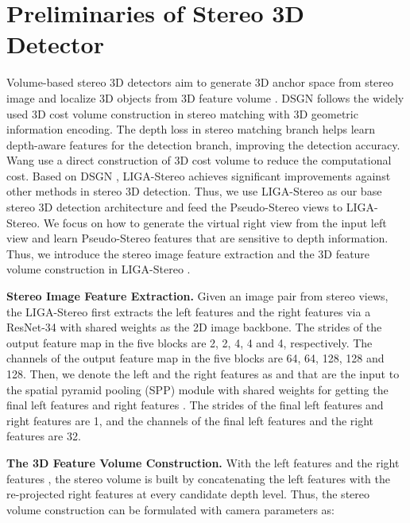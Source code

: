 \documentclass[10pt,twocolumn,letterpaper]{article}
\begin{document}
\section{Preliminaries of Stereo 3D Detector}\label{sec:liga}
Volume-based stereo 3D detectors aim to generate 3D anchor space from stereo image \cite{qin2019triangulation} and localize 3D objects from 3D feature volume \cite{chen2020dsgn,wang2021plume,guo2021liga}. DSGN \cite{chen2020dsgn} follows the widely used 3D cost volume construction in stereo matching \cite{xu2020aanet,tankovich2021hitnet,gu2020cascade} with 3D geometric information encoding. The depth loss in stereo matching branch helps learn depth-aware features for the detection branch, improving the detection accuracy. Wang  \cite{wang2021plume} use a direct construction of 3D cost volume to reduce the computational cost. Based on DSGN \cite{chen2020dsgn}, LIGA-Stereo \cite{guo2021liga} achieves significant improvements against other methods \cite{chen2020dsgn,PL++,bewley2020range} in stereo 3D detection. Thus, we use LIGA-Stereo \cite{guo2021liga} as our base stereo 3D detection architecture and feed the Pseudo-Stereo views to LIGA-Stereo. We focus on how to generate the virtual right view from the input left view and learn Pseudo-Stereo features that are sensitive to depth information. Thus, we introduce the stereo image feature extraction and the 3D feature volume construction in LIGA-Stereo \cite{guo2021liga}. 

\textbf{Stereo Image Feature Extraction.}
Given an image pair  from stereo views, the LIGA-Stereo \cite{guo2021liga} first extracts the left features and the right features via a ResNet-34 \cite{he2016deep} with shared weights as the 2D image backbone.
The strides of the output feature map in the five blocks are 2, 2, 4, 4 and 4, respectively. The channels of the output feature map in the five blocks are 64, 64, 128, 128 and 128. Then, we denote the left and the right features as  and  that are the input to the spatial pyramid pooling (SPP) module \cite{chang2018pyramid} with shared weights for getting the final left features  and right features . The strides of the final left features  and right features  are 1, and the channels of the final left features  and the right features  are 32.



\textbf{The 3D Feature Volume Construction. }
With the left features  and the right features , the stereo volume  is built by concatenating the left features  with the re-projected right features  at every candidate depth level. Thus, the stereo volume construction can be formulated with camera parameters as:
\end{document}
